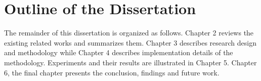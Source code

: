 \section{Outline of the Dissertation}

The remainder of this dissertation is organized as follows. Chapter 2 reviews the existing
related works and summarizes them. Chapter 3 describes research design and methodology while
Chapter 4 describes implementation details of the methodology. Experiments and their results
are illustrated in Chapter 5. Chapter 6, the final chapter presents the conclusion, findings
and future work. 
